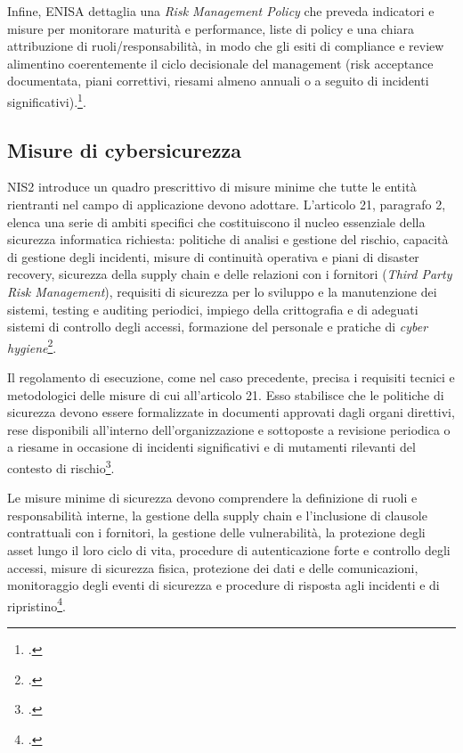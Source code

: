 Infine, ENISA dettaglia una \textit{Risk Management Policy} che preveda indicatori e misure per monitorare maturità e performance, 
liste di policy e una chiara attribuzione di ruoli/responsabilità, in modo che gli esiti di compliance e review alimentino 
coerentemente il ciclo decisionale del management (risk acceptance documentata, piani correttivi, riesami almeno annuali o a 
seguito di incidenti significativi).\footcite[pp. 9--25]{enisa-implementing-guidance}.


\subsection{Misure di cybersicurezza}
NIS2 introduce un quadro prescrittivo di misure minime che tutte le entità rientranti nel campo di 
applicazione devono adottare. L’articolo 21, paragrafo 2, elenca una serie di ambiti specifici 
che costituiscono il nucleo essenziale della sicurezza informatica richiesta: politiche di analisi e gestione 
del rischio, capacità di gestione degli incidenti, misure di continuità operativa e piani di disaster recovery, 
sicurezza della supply chain e delle relazioni con i fornitori (\textit{Third Party Risk Management}), 
requisiti di sicurezza per lo sviluppo e la manutenzione dei sistemi, testing e auditing periodici, 
impiego della crittografia e di adeguati sistemi di controllo degli accessi, formazione del personale 
e pratiche di \textit{cyber hygiene}\footcite[art. 21]{nis2-directive}. 

Il regolamento di esecuzione, come nel caso precedente, precisa i requisiti tecnici e metodologici 
delle misure di cui all’articolo 21. Esso stabilisce che le politiche di sicurezza devono essere formalizzate 
in documenti approvati dagli organi direttivi, rese disponibili all’interno dell’organizzazione e sottoposte a revisione periodica o a riesame 
in occasione di incidenti significativi e di mutamenti rilevanti del contesto di rischio\footcite[art. 3]{regolamento-2690}.

Le misure minime di sicurezza devono comprendere
la definizione di ruoli e responsabilità interne, la gestione della supply chain e l’inclusione di clausole 
contrattuali con i fornitori, la gestione delle vulnerabilità, la protezione degli asset lungo il loro ciclo 
di vita, procedure di autenticazione forte e controllo degli accessi, misure di sicurezza fisica, protezione 
dei dati e delle comunicazioni, monitoraggio degli eventi di sicurezza e procedure di risposta agli incidenti 
e di ripristino\footcite[Allegato]{regolamento-2690}.

